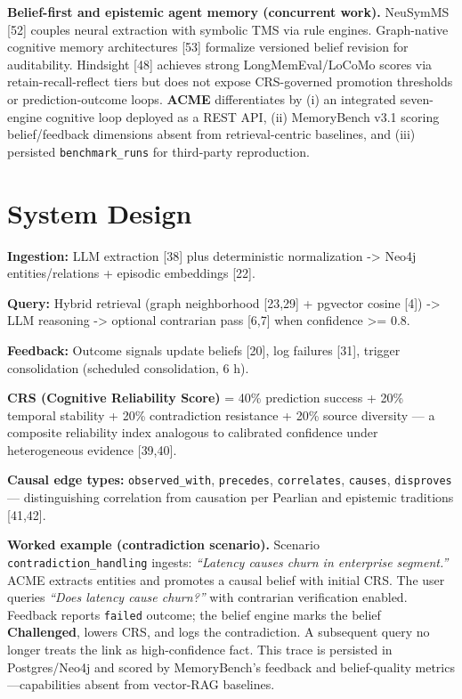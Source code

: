 \documentclass[11pt,a4paper]{article}
\begin{document}
\textbf{Belief-first and epistemic agent memory (concurrent work).}
NeuSymMS {[}52{]} couples neural extraction with symbolic TMS via rule
engines. Graph-native cognitive memory architectures {[}53{]} formalize
versioned belief revision for auditability. Hindsight {[}48{]} achieves
strong LongMemEval/LoCoMo scores via retain-recall-reflect tiers but
does not expose CRS-governed promotion thresholds or prediction-outcome
loops. \textbf{ACME} differentiates by (i) an integrated seven-engine
cognitive loop deployed as a REST API, (ii) MemoryBench v3.1 scoring
belief/feedback dimensions absent from retrieval-centric baselines, and
(iii) persisted \texttt{benchmark\_runs} for third-party reproduction.

\section{System Design}\label{system-design}

\acmeFigureLoop

\textbf{Ingestion:} LLM extraction {[}38{]} plus deterministic
normalization -\textgreater{} Neo4j entities/relations + episodic
embeddings {[}22{]}.

\textbf{Query:} Hybrid retrieval (graph neighborhood {[}23,29{]} +
pgvector cosine {[}4{]}) -\textgreater{} LLM reasoning -\textgreater{}
optional contrarian pass {[}6,7{]} when confidence \textgreater= 0.8.

\textbf{Feedback:} Outcome signals update beliefs {[}20{]}, log failures
{[}31{]}, trigger consolidation (scheduled consolidation, 6 h).

\acmeFigureBelief

\textbf{CRS (Cognitive Reliability Score)} = 40\% prediction success +
20\% temporal stability + 20\% contradiction resistance + 20\% source
diversity --- a composite reliability index analogous to calibrated
confidence under heterogeneous evidence {[}39,40{]}.

\textbf{Causal edge types:} \texttt{observed\_with}, \texttt{precedes},
\texttt{correlates}, \texttt{causes}, \texttt{disproves} ---
distinguishing correlation from causation per Pearlian and epistemic
traditions {[}41,42{]}.

\textbf{Worked example (contradiction scenario).} Scenario
\texttt{contradiction\_handling} ingests: \emph{``Latency causes churn
in enterprise segment.''} ACME extracts entities and promotes a causal
belief with initial CRS. The user queries \emph{``Does latency cause
churn?''} with contrarian verification enabled. Feedback reports
\texttt{failed} outcome; the belief engine marks the belief
\textbf{Challenged}, lowers CRS, and logs the contradiction. A
subsequent query no longer treats the link as high-confidence fact. This
trace is persisted in Postgres/Neo4j and scored by MemoryBench's
feedback and belief-quality metrics---capabilities absent from
vector-RAG baselines.
\end{document}
